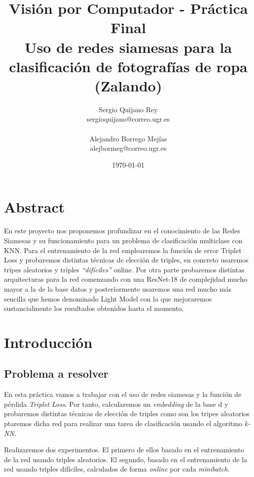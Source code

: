 \documentclass[11pt]{article}
\title{
    {Visión por Computador - Práctica Final} \\
    {Uso de redes siamesas para la clasificación de fotografías de ropa (Zalando)}
}
\author{
    {Sergio Quijano Rey}\\
    {sergioquijano@correo.ugr.es} \\
    {}\\
    {Alejandro Borrego Mejías} \\
    {alejbormeg@correo.ugr.es}\\
}
\date{\today}
\newcommand{\entrecomillado}[1]{\emph{``#1''}}
\begin{document}
\maketitle
\pagebreak

\tableofcontents


\listoffigures

\listoftables

{}

\pagebreak

\section{Abstract}
En este proyecto nos proponemos profundizar en el conocimiento de las Redes Siamesas y su funcionamiento para un problema de clasificación multiclase con KNN. Para el entrenamiento de la red emplearemos la función de error Triplet Loss y probaremos distintas técnicas de elección de triples, en concreto usaremos tripes aleatorios y triples \entrecomillado{difíciles} online. Por otra parte probaremos distintas arquitecturas para la red comenzando con una ResNet-18 de complejidad mucho mayor a la de la base datos y posteriormente usaremos una red mucho más sencilla que hemos denominado Light Model con la que mejoraremos sustancialmente los resultados obtenidos hasta el momento.

\section{Introducción}

\subsection{Problema a resolver}

En esta práctica vamos a trabajar con el uso de redes siamesas y la función de pérdida \emph{Triplet Loss}. Por tanto, calcularemos un \emph{embedding} de la base d y probaremos distintas técnicas de elección de triples como son los tripes aleatorios ptaremos dicha red para realizar una tarea de clasificación usando el algoritmo \emph{k-NN}.

Realizaremos dos experimentos. El primero de ellos basado en el entrenamiento de la red usando triples aleatorios. El segundo, basado en el entrenamiento de la red usando triples difíciles, calculados de forma \emph{online} por cada \emph{minibatch}.
\end{document}
